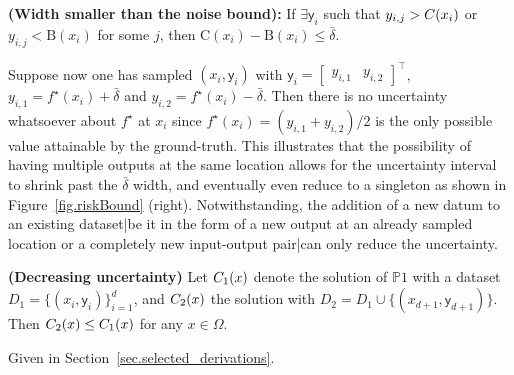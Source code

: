 \begin{proposition} 
	\label{prop.smallWidth}
	{\normalfont \textbf{(Width smaller than the noise bound):}}
	If $\exists \mathsf{y}_i$ such that $y_{i,j} > {\normalfont C}(x_i)$ or $y_{i,j} < \text{B}(x_i)$ for some $j$, then $\text{C}(x_i) - \text{B}(x_i) \leq \bar \delta$.
\end{proposition}

Suppose now one has sampled $(x_i,\mathsf{y}_i)$ with $\mathsf{y}_i = \begin{bmatrix} y_{i,1} & y_{i,2} \end{bmatrix}^\top$, $y_{i,1} = f^\star(x_i) + \bar \delta$ and $y_{i,2} = f^\star(x_i) - \bar \delta$. Then there is no uncertainty whatsoever about $f^\star$ at $x_i$ since $f^\star(x_i) = (y_{i,1} + y_{i,2})/2$ is the only possible value attainable by the ground-truth. This illustrates that the possibility of having multiple outputs at the same location allows for the uncertainty interval to shrink past the $\bar \delta$ width, and eventually even reduce to a singleton as shown in Figure~\ref{fig.riskBound} (right). Notwithstanding, the addition of a new datum to an existing dataset|be it in the form of a new output at an already sampled location or a completely new input-output pair|can only reduce the uncertainty.

\begin{proposition} 
	\label{prop.decreasing}
	{\normalfont \textbf{(Decreasing uncertainty)}}
	Let $C_{{\normalfont 1}}(x)$ denote the solution of $\mathds{P}1$ with a dataset $D_1 = \{(x_i,\mathsf{y}_i)\}_{i=1}^{d}$, and $C_{{\normalfont 2}}(x)$ the solution with $D_2 = D_1 \cup \{(x_{d+1},\mathsf{y}_{d+1})\}$. Then $C_{{\normalfont 2}}(x) \leq C_{{\normalfont 1}}(x)$ for any $x \in \Omega$. 
\end{proposition}
\begin{my_proof}
	Given in Section~\ref{sec.selected_derivations}.
\end{my_proof}


